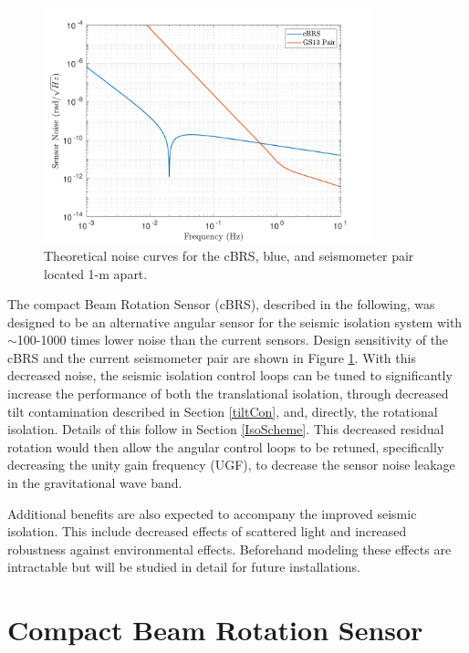 \documentclass [12pt, proquest]{uwthesis}[2019]
\begin{document}
\begin{figure}[!h]
\begin{center}
\includegraphics[width=0.85\textwidth]{sensorNoise.pdf}
\caption[Theoretical noise curves for the cBRS and seismometer pair]{Theoretical noise curves for the cBRS, blue, and seismometer pair located 1-m apart.}
\label{sensNoise}
\end{center}
\end{figure}


The compact Beam Rotation Sensor (cBRS), described in the following, was designed to be an alternative angular sensor for the seismic isolation system with $\sim$100-1000 times lower noise than the current sensors. Design sensitivity of the cBRS and the current seismometer pair are shown in Figure \ref{sensNoise}. With this decreased noise, the seismic isolation control loops can be tuned to significantly increase the performance of both the translational isolation, through decreased tilt contamination described in Section \ref{tiltCon}, and, directly, the rotational isolation. Details of this follow in Section \ref{IsoScheme}. This decreased residual rotation would then allow the angular control loops to be retuned, specifically decreasing the unity gain frequency (UGF), to decrease the sensor noise leakage in the gravitational wave band.

Additional benefits are also expected to accompany the improved seismic isolation. This include decreased effects of scattered light and increased robustness against environmental effects. Beforehand modeling these effects are intractable but will be studied in detail for future installations.


\section{Compact Beam Rotation Sensor} \label{cBRSSec}
\end{document}
